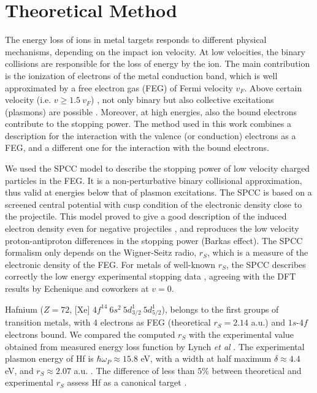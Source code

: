 \documentclass[aps,pra,reprint,groupedaddress]{revtex4-1}
\begin{document}
\section{Theoretical Method} \label{theory}
The energy loss of ions in metal targets responds to different physical mechanisms, depending on the impact ion velocity. At low velocities, the binary collisions are responsible for the loss of energy by the ion. The main contribution is the ionization of electrons of the metal conduction band, which is well approximated by a free electron gas (FEG) of Fermi velocity $v_F$. Above certain velocity (i.e. $v\geq 1.5 \ v_F$) , not only binary but also collective excitations (plasmons) are possible \cite{mon17}. Moreover, at high energies, also the bound electrons contribute to the stopping power. The method used in this work combines a description for the interaction with the valence (or conduction) electrons as a FEG, and a different one for the interaction with the bound electrons.

We used the SPCC model \cite{mon17} to describe the stopping power of low velocity charged particles in the FEG. It is a non-perturbative binary collisional approximation, thus valid at energies below that of plasmon excitations.  The SPCC \cite{mon17} is based on a screened central potential with cusp condition of the electronic density close to the projectile. This model proved to give a good description of the induced electron density even for negative projectiles \cite{mon17}, and reproduces the low velocity proton-antiproton differences in the stopping power (Barkas effect). The SPCC formalism only depends on the Wigner-Seitz radio, $r_S$, which is a measure of the electronic density of the FEG. For metals of well-known $r_S$, the SPCC describes correctly the low energy experimental stopping data \cite{mon17}, agreeing with the DFT results by Echenique and coworkers \cite{eche81,nagy89} at $v=0$. 

Hafnium ($Z=72$, [Xe] $4f^{14} \ 6s^2 \ 5d_{3/2}^1 \ 5d_{5/2}^1$), belongs to the first groups of transition metals, with  4 electrons as FEG (theoretical $r_S=2.14$ a.u.) and $1s$-$4f$ electrons bound. We compared the computed $r_S$ with the experimental value obtained from measured energy loss function by Lynch \textit{et al} \cite{lynch75}. The experimental plasmon energy of Hf is $\hbar\omega_P \approx 15.8$ eV, with a width at half maximum $\delta \approx 4.4$ eV, and $r_S \approx 2.07$ a.u. \cite{lynch75}. The difference of less than $5\%$ between theoretical and experimental $r_S$ assess Hf as a canonical target \cite{mon17}.
\end{document}
